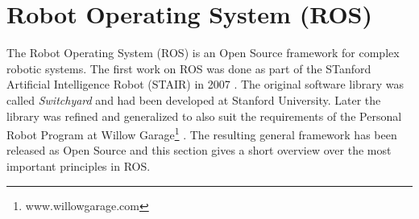 

\section{Robot Operating System (ROS)}
\label{ros_overview}
The Robot Operating System (ROS) is an Open Source framework for complex robotic systems. The first work on ROS was done as part of the STanford Artificial Intelligence Robot (STAIR) in 2007 \cite{Quigley2007}. The original software library was called \emph{Switchyard} and had been developed at Stanford University. Later the library was refined and generalized to also suit the requirements of the Personal Robot Program at Willow Garage\footnote{www.willowgarage.com} \cite{Quigley2009}. The resulting general framework has been released as Open Source \cite{Quigley2009} and this section gives a short overview over the most important principles in ROS.

